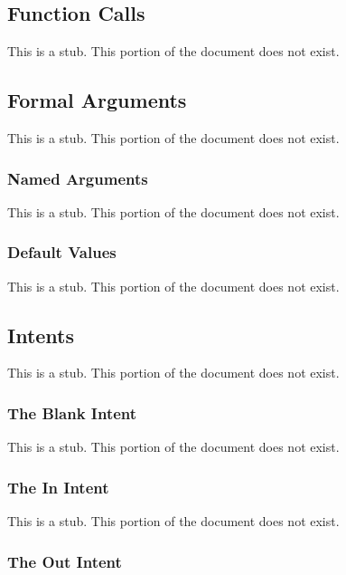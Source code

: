 \subsection{Function Calls}
\label{Function_Calls}

This is a stub.  This portion of the document does not exist.

\subsection{Formal Arguments}
\label{Formal_Arguments}

This is a stub.  This portion of the document does not exist.

\subsubsection{Named Arguments}
\label{Named_Arguments}

This is a stub.  This portion of the document does not exist.

\subsubsection{Default Values}
\label{Default_Values}

This is a stub.  This portion of the document does not exist.

\subsection{Intents}
\label{Intents}

This is a stub.  This portion of the document does not exist.

\subsubsection{The Blank Intent}
\label{The_Blank_Intent}

This is a stub.  This portion of the document does not exist.

\subsubsection{The In Intent}
\label{The_In_Intent}

This is a stub.  This portion of the document does not exist.

\subsubsection{The Out Intent}
\label{The_Out_Intent}

